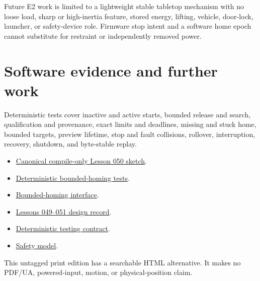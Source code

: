 \documentclass[10pt]{article}
\begin{document}
Future E2 work is limited to a lightweight stable tabletop mechanism with no
loose load, sharp or high-inertia feature, stored energy, lifting, vehicle,
door-lock, launcher, or safety-device role. Firmware stop intent and a
software home epoch cannot substitute for restraint or independently removed
power.

\section{Software evidence and further work}
Deterministic tests cover inactive and active starts, bounded release and
search, qualification and provenance, exact limits and deadlines, missing
and stuck home, bounded targets, preview lifetime, stop and fault collisions,
rollover, interruption, recovery, shutdown, and byte-stable replay.

\begin{itemize}
 \item \href{https://github.com/spincyc/adk/blob/main/examples/Lesson050BoundedHomingPolicy/Lesson050BoundedHomingPolicy.ino}
       {Canonical compile-only Lesson 050 sketch}.
 \item \href{https://github.com/spincyc/adk/blob/main/tests/test_bounded_homing_policy.cpp}
       {Deterministic bounded-homing tests}.
 \item \href{https://github.com/spincyc/adk/blob/main/src/bounded_homing_policy.h}
       {Bounded-homing interface}.
 \item \href{https://github.com/spincyc/adk/blob/main/docs/design/LESSONS_049_051_PARTS_CAROUSEL_PLAN.md}
       {Lessons 049--051 design record}.
 \item \href{https://github.com/spincyc/adk/blob/main/docs/TESTING.md}
       {Deterministic testing contract}.
 \item \href{https://github.com/spincyc/adk/blob/main/docs/SAFETY_MODEL.md}
       {Safety model}.
\end{itemize}

This untagged print edition has a searchable HTML alternative.
It makes no PDF/UA, powered-input, motion, or physical-position claim.
\end{document}
